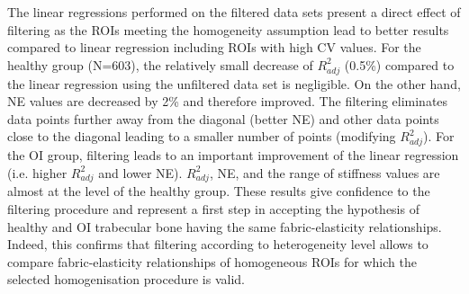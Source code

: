 \documentclass[a4paper,fleqn]{DC_ArtStyle}
\begin{document}
	The linear regressions performed on the filtered data sets present a direct effect of filtering as the ROIs meeting the homogeneity assumption lead to better results compared to linear regression including ROIs with high CV values. For the healthy group (N=603), the relatively small decrease of $R^2_{adj}$ (0.5\%) compared to the linear regression using the unfiltered data set is negligible. On the other hand, NE values are decreased by 2\% and therefore improved. The filtering eliminates data points further away from the diagonal (better NE) and other data points close to the diagonal leading to a smaller number of points (modifying $R^2_{adj}$). For the OI group, filtering leads to an important improvement of the linear regression (i.e. higher $R^2_{adj}$ and lower NE). $R^2_{adj}$, NE, and the range of stiffness values are almost at the level of the healthy group. These results give confidence to the filtering procedure and represent a first step in accepting the hypothesis of healthy and OI trabecular bone having the same fabric-elasticity relationships. Indeed, this confirms that filtering according to heterogeneity level allows to compare fabric-elasticity relationships of homogeneous ROIs for which the selected homogenisation procedure is valid.\\
	
\end{document}
